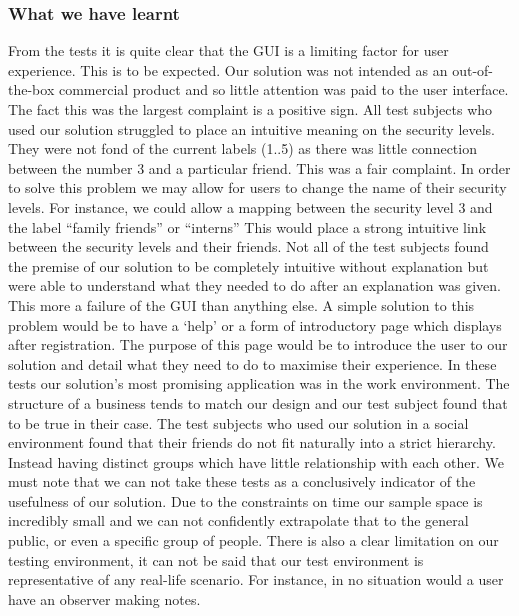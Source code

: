 \documentclass[12pt, titlepage]{article}
\begin{document}
\subsubsection{What we have learnt}
From the tests it is quite clear that the GUI is a limiting factor for user experience. This is to be expected. Our solution was not intended as an out-of-the-box commercial product and so little attention was paid to the user interface. The fact this was the largest complaint is a positive sign.
\newline \indent All test subjects who used our solution struggled to place an intuitive meaning on the security levels. They were not fond of the current labels (1..5) as there was little connection between the number 3 and a particular friend. This was a fair complaint. In order to solve this problem we may allow for users to change the name of their security levels. For instance, we could allow a mapping between the security level 3 and the label ``family friends'' or ``interns'' This would place a strong intuitive link between the security levels and their friends.
\newline \indent Not all of the test subjects found the premise of our solution to be completely intuitive without explanation but were able to understand what they needed to do after an explanation was given. This more a failure of the GUI than anything else. A simple solution to this problem would be to have a `help' or a form of introductory page which displays after registration. The purpose of this page would be to introduce the user to our solution and detail what they need to do to maximise their experience. 
\newline \indent In these tests our solution's most promising application was in the work environment. The structure of a business tends to match our design and our test subject found that to be true in their case. The test subjects who used our solution in a social environment found that their friends do not fit naturally into a strict hierarchy. Instead having distinct groups which have little relationship with each other.
\newline \indent We must note that we can not take these tests as a conclusively indicator of the usefulness of our solution. Due to the constraints on time our sample space is incredibly small and we can not confidently extrapolate that to the general public, or even a specific group of people. There is also a clear limitation on our testing environment, it can not be said that our test environment is representative of any real-life scenario. For instance, in no situation would a user have an observer making notes.
\end{document}
